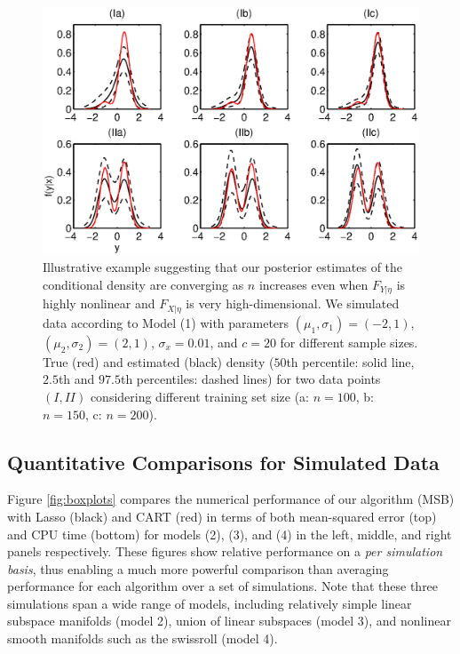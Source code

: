 \begin{figure}[h!]
\centering
 \vskip -10pt 
\includegraphics[width=120mm]{../figs/ch3_density.eps}
 \vskip -15pt 
\caption{Illustrative example suggesting that our posterior estimates of the conditional density are converging as $n$ increases even when $F_{Y|\eta}$ is highly nonlinear and $F_{X|\eta}$ is very high-dimensional.  We simulated data according to Model (1) with parameters $(\mu_1,\sigma_1)=(-2,1)$, $(\mu_2,\sigma_2)=(2,1)$, $\sigma_x=0.01$, and $c=20$ for different sample sizes. True (red) and estimated (black) density ($50$th percentile: solid line, $2.5$th and $97.5$th percentiles: dashed lines) for two data points $(I, II)$ considering different training set size (a: $n=100$, b: $n=150$, c: $n=200$). } \label{plotDensity}
\end{figure}




\subsection{Quantitative Comparisons for Simulated Data} 

Figure \ref{fig:boxplots} compares the numerical performance of our algorithm (MSB) with Lasso (black) and CART (red) in terms of both mean-squared error (top) and CPU time (bottom) for models (2), (3), and (4) in the left, middle, and right panels respectively. These figures show relative performance on a \emph{per simulation basis}, thus enabling a much more powerful comparison than averaging performance for each algorithm over a set of simulations.  Note that these three simulations span a wide range of models, including relatively simple linear subspace manifolds (model 2), union of linear subspaces (model 3), and nonlinear smooth manifolds such as the swissroll (model 4).

